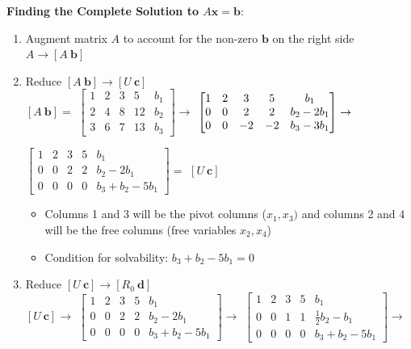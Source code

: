 \documentclass[11pt]{article}
\begin{document}
\textbf{Finding the Complete Solution to $A\boldsymbol{x} = \boldsymbol{b}$}:
\begin{enumerate}
    \item Augment matrix $A$ to account for the non-zero $\boldsymbol{b}$ on the right side \\
    
    $A \rightarrow \left[A \ \boldsymbol{b}\right]$

    \item Reduce $\left[A \ \boldsymbol{b}\right] \rightarrow \left[U \ \boldsymbol{c}\right]$ \\
    
    $\left[A \ \boldsymbol{b}\right] = $
    $
    \begin{bmatrix}
        1 & 2 & 3 & 5 & b_1 \\
        2 & 4 & 8 & 12 & b_2 \\
        3 & 6 & 7 & 13 & b_3
    \end{bmatrix} \rightarrow
    $
    $
    \begin{bmatrix}
        1 & 2 & 3 & 5 & b_1 \\
        0 & 0 & 2 & 2 & b_2 - 2b_1 \\
        0 & 0 & -2 & -2 & b_3 - 3b_1
    \end{bmatrix} \rightarrow \\
    $

    $
    \begin{bmatrix}
        1 & 2 & 3 & 5 & b_1 \\
        0 & 0 & 2 & 2 & b_2 - 2b_1 \\
        0 & 0 & 0 & 0 & b_3 + b_2 - 5b_1
    \end{bmatrix} =
    $
    $\left[U \ \boldsymbol{c}\right] $ \\
    \begin{itemize}
        \item Columns 1 and 3 will be the pivot columns ($x_1, x_3)$ 
        and columns 2 and 4 will be the free columns (free variables $x_2, x_4$)
        \item Condition for solvability: $b_3 + b_2 - 5b_1 = 0$ 
    \end{itemize}

    \item Reduce $\left[U \ \boldsymbol{c}\right] \rightarrow \left[R_0 \ \boldsymbol{d}\right]$ \\ 
    
    $\left[U \ \boldsymbol{c}\right] \rightarrow $ 
    $
    \begin{bmatrix}
        1 & 2 & 3 & 5 & b_1 \\
        0 & 0 & 2 & 2 & b_2 - 2b_1 \\
        0 & 0 & 0 & 0 & b_3 + b_2 - 5b_1
    \end{bmatrix} \rightarrow
    $
    $
    \begin{bmatrix}
        1 & 2 & 3 & 5 & b_1 \\
        0 & 0 & 1 & 1 & \frac{1}{2}b_2 - b_1 \\
        0 & 0 & 0 & 0 & b_3 + b_2 - 5b_1
    \end{bmatrix} \rightarrow
    $ \\


\end{enumerate}
\end{document}
